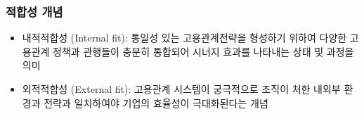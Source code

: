 \documentclass[aspectratio=169,xcolor=dvipsnames,handout]{beamer}
\begin{document}
\begin{frame}
    \frametitle{적합성 개념}
    \begin{itemize}[<+->]
        \item 내적적합성 (Internal fit): 통일성 있는 고용관계전략을 형성하기 위하여 다양한 고용관계 정책과 관행들이 충분히 통합되어 시너지 효과를 나타내는 상태 및 과정을 의미
        \item 외적적합성 (External fit): 고용관계 시스템이 궁극적으로 조직이 처한 내외부 환경과 전략과 일치하여야 기업의 효율성이 극대화된다는 개념
    \end{itemize}
\end{frame}


\end{document}
